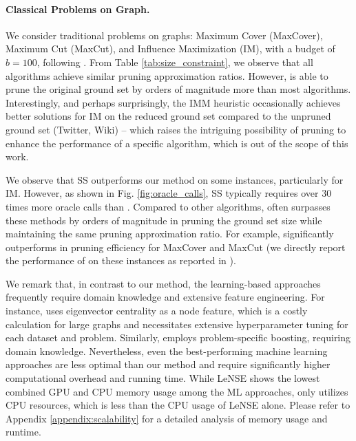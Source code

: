 \paragraph{Classical Problems on Graph.}
We consider traditional problems on graphs: Maximum Cover (MaxCover), Maximum Cut (MaxCut), and Influence Maximization (IM),
with a budget of $b=100$, following \cite{ireland2022lense}. From Table \ref{tab:size_constraint}, we observe that all algorithms achieve similar pruning approximation ratios. However, \qs{} is able to prune the original ground set by orders of magnitude more than most algorithms. Interestingly, and perhaps surprisingly, the IMM heuristic \citep{tang2015influence} occasionally achieves better solutions for IM
on the reduced ground set compared to the unpruned ground set (\eg Twitter, Wiki) -- which raises the intriguing
possibility of pruning to enhance the performance of a specific algorithm, which is out of the scope of this work. 

We observe that SS outperforms our method on some instances, particularly for IM.
However, as shown in Fig. \ref{fig:oracle_calls}, SS typically requires over $30$ times more oracle calls than \qs{}. Compared to other algorithms, \qs{} often surpasses these methods by orders of magnitude in pruning the ground set size while maintaining the same pruning approximation ratio. For example, \qs{} significantly outperforms \gcomb{} in pruning efficiency for MaxCover and MaxCut (we directly report the performance of \gcomb{} on these instances as reported in \cite{ireland2022lense}).

We remark that, in contrast to our method, the learning-based approaches frequently require domain knowledge and extensive feature engineering. For instance, \lense{} uses eigenvector centrality as a node feature, which is a costly calculation for large graphs and necessitates extensive hyperparameter tuning for each dataset and problem. Similarly, \comb{} employs problem-specific boosting, requiring domain knowledge.
Nevertheless, even the best-performing machine learning approaches are less optimal than our method and require significantly higher computational overhead and running time. While LeNSE shows the lowest combined GPU and CPU memory usage among the ML approaches, \qs only utilizes CPU resources, which is less than the CPU usage of LeNSE alone. Please refer to Appendix \ref{appendix:scalability} for a detailed analysis of memory usage and runtime.
